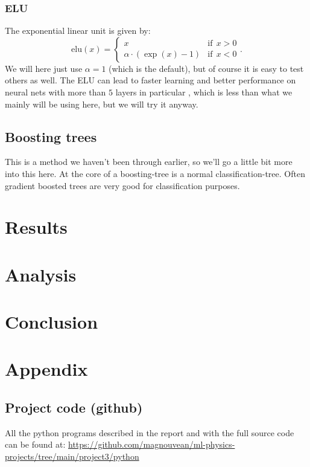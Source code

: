 \documentclass{article}
\begin{document}
\subsubsection{ELU}
The exponential linear unit is given by:
$$\text{elu}(x) = \begin{cases} x \qquad \qquad & \text{if}\ \ x > 0 \\ \alpha \cdot (\exp(x) - 1) & \text{if}\ \ x < 0 \end{cases}.$$ \cite{tensorflowdocelu}
We will here just use $\alpha = 1$ (which is the default), but of course it is
easy to test others as well. The ELU can lead to faster learning and better
performance on neural nets with more than $5$ layers in particular
\cite{clevert2016fast}, which is less than what we mainly will be using here,
but we will try it anyway.

\subsection{Boosting trees}
This is a method we haven't been through earlier, so we'll go a little bit more
into this here. At the core of a boosting-tree is a normal classification-tree.
Often gradient boosted trees are very good for classification purposes.

\section{Results}

\section{Analysis}

\section{Conclusion}

\section{Appendix}

\subsection{Project code (github)}
All the python programs described in the report and with the full source code can be
found at:
\url{https://github.com/magnouvean/ml-physics-projects/tree/main/project3/python}


\end{document}
